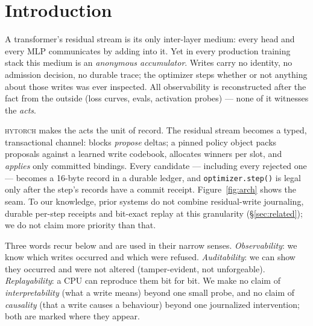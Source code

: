 \documentclass[10pt,twocolumn]{article}
\newcommand{\sys}{\textsc{hytorch}}
\begin{document}
\section{Introduction}
\label{sec:intro}

A transformer's residual stream is its only inter-layer medium: every head
and every MLP communicates by adding into it. Yet in every production
training stack this medium is an \emph{anonymous accumulator}. Writes carry
no identity, no admission decision, no durable trace; the optimizer steps
whether or not anything about those writes was ever inspected. All
observability is reconstructed after the fact from the outside (loss curves,
evals, activation probes) --- none of it witnesses the \emph{acts}.

\sys{} makes the acts the unit of record. The residual stream becomes a
typed, transactional channel: blocks \emph{propose} deltas; a pinned policy
object packs proposals against a learned write codebook, allocates winners
per slot, and \emph{applies} only committed bindings. Every candidate ---
including every rejected one --- becomes a 16-byte record in a durable
ledger, and \texttt{optimizer.step()} is legal only after the step's records
have a commit receipt. Figure~\ref{fig:arch} shows the seam. To our
knowledge, prior systems do not combine residual-write journaling, durable
per-step receipts and bit-exact replay at this granularity
(\S\ref{sec:related}); we do not claim more priority than that.

Three words recur below and are used in their narrow senses.
\emph{Observability}: we know which writes occurred and which were refused.
\emph{Auditability}: we can show they occurred and were not altered
(tamper-evident, not unforgeable). \emph{Replayability}: a CPU can reproduce
them bit for bit. We make no claim of \emph{interpretability} (what a write
means) beyond one small probe, and no claim of \emph{causality} (that a write
causes a behaviour) beyond one journalized intervention; both are marked
where they appear.
\end{document}
